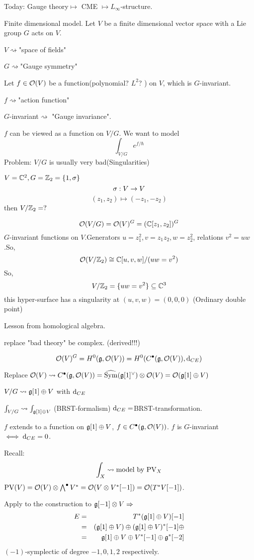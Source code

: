 Today: Gauge theory$\mapsto$ CME $\mapsto L_\infty$-structure.

Finite dimensional model.
Let $V$ be a finite dimensional vector space with a Lie group $G$ acts on $V$.

$V\rightsquigarrow$"space of fields"

$G\rightsquigarrow$"Gauge symmetry"

Let $f\in\mathcal{O}(V)$ be a function(polynomial? $L^2$? )
on $V$, which is $G$-invariant.

$f\rightsquigarrow$"action function"

$G$-invariant$\rightsquigarrow$ "Gauge invariance".

$f$ can be viewed as a function on $V/G$.
We want to model
$$\int_{V/G}e^{f/\hbar}$$
Problem: $V/G$ is usually very bad(Singularities)

\begin{example}
$V=\mathbb{C}^2,G=\mathbb{Z}_2=\{1,\sigma\}$
$$\sigma:V\to V$$
$$(z_1,z_2)\mapsto(-z_1,-z_2)$$
then $V/\mathbb{Z}_2=?$
\end{example}
$$\mathcal{O}(V/G)=\mathcal{O}(V)^G=(\mathbb{C}[z_1,z_2])^G$$
$G$-invariant functions on $V$.Generators $u=z_1^2,v=z_1z_2,w=z_2^2$,
relations $v^2=uw$.So,
$$\mathcal{O}(V/\mathbb{Z}_2)\cong \mathbb{C}[u,v,w]/(uw=v^2)$$
So,
$$V/\mathbb{Z}_2=\{uw=v^2\}\subseteq\mathbb{C}^3$$
this hyper-surface has a singularity at
$(u,v,w)=(0,0,0)$
(Ordinary double point)

Lesson from homological algebra.

replace "bad theory" be complex.
(derived!!!)

$$\mathcal{O}(V)^G=H^0(\mathfrak{g},\mathcal{O}(V))
=H^0(C^{\bullet}(\mathfrak{g},\mathcal{O}(V)),\mathrm{d}_{CE})$$

Replace $\mathcal{O}(V)\rightsquigarrow C^{\bullet}(\mathfrak{g},\mathcal{O}(V))=
\widehat{\operatorname{Sym}}(\mathfrak{g}[1]^\vee)\otimes\mathcal{O}(V)=\mathcal{O}(\mathfrak{g}[1]\oplus V)$

$V/G\rightsquigarrow\mathfrak{g}[1]\oplus V$ with $\mathrm{d}_{CE}$

$\int_{V/G}\rightsquigarrow\int_{\mathfrak{g}[1]\oplus V}$
(BRST-formalism) $\mathrm{d}_{CE}=$BRST-transformation.

$f$ extends to a function on $\mathfrak{g}[1]\oplus V$,
$f\in C^{\bullet}(\mathfrak{g},\mathcal{O}(V))$.
$f$ is $G$-invariant$\iff \mathrm{d}_{CE}=0$.
\vs

Recall:
$$\int_X\rightsquigarrow\text{model by $\operatorname{PV}_X$}$$
$\operatorname{PV}(V)=\mathcal{O}(V)\otimes\bigwedge\nolimits^{\bullet}V^*
=\mathcal{O}(V\otimes V^*[-1])=\mathcal{O}(T^*V[-1])$.

Apply to the construction to $\mathfrak{g}[-1]\otimes V\Rightarrow$
\begin{eqnarray*}
     E
&=&
     T^*(\mathfrak{g}[1]\oplus V)[-1]\\
&=&
     (\mathfrak{g}[1]\oplus V)\oplus
     (\mathfrak{g}[1]\oplus V)^*[-1]\oplus\\
&=&
     \mathfrak{g}[1]\oplus V\oplus V^*[-1]\oplus\mathfrak{g}^*[-2]
\end{eqnarray*}
$(-1)$-symplectic of degree $-1,0,1,2$ respectively.

